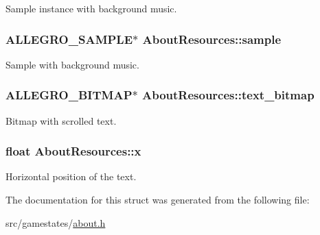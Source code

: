 Sample instance with background music. \hypertarget{structAboutResources_a3dff2cf8b4e55a6d99af8492863d0a18}{
\subsubsection[{sample}]{\setlength{\rightskip}{0pt plus 5cm}A\+L\+L\+E\+G\+R\+O\+\_\+\+S\+A\+M\+P\+L\+E$\ast$ About\+Resources\+::sample}}\label{structAboutResources_a3dff2cf8b4e55a6d99af8492863d0a18}
Sample with background music. \hypertarget{structAboutResources_ab815d61a599147b4d69653c458b4c383}{
\subsubsection[{text\+\_\+bitmap}]{\setlength{\rightskip}{0pt plus 5cm}A\+L\+L\+E\+G\+R\+O\+\_\+\+B\+I\+T\+M\+A\+P$\ast$ About\+Resources\+::text\+\_\+bitmap}}\label{structAboutResources_ab815d61a599147b4d69653c458b4c383}
Bitmap with scrolled text. \hypertarget{structAboutResources_ae76f540590fc3891af877f9ffa5823c8}{
\subsubsection[{x}]{\setlength{\rightskip}{0pt plus 5cm}float About\+Resources\+::x}}\label{structAboutResources_ae76f540590fc3891af877f9ffa5823c8}
Horizontal position of the text. 

The documentation for this struct was generated from the following file\+:\begin{DoxyCompactItemize}
\item 
src/gamestates/\hyperlink{about_8h}{about.\+h}\end{DoxyCompactItemize}
